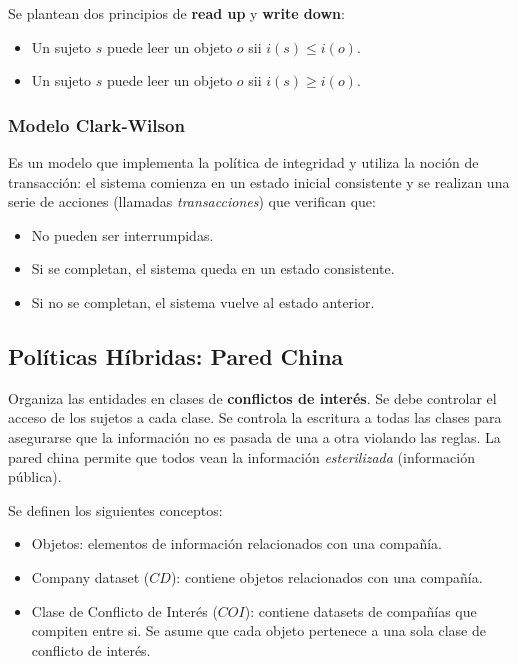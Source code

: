 \documentclass[]{article}
\begin{document}
 Se plantean dos principios de \textbf{read up} y \textbf{write down}:
 \begin{itemize}
 	\item Un sujeto $s$ puede leer un objeto $o$ sii $i(s) \leq i(o)$.
 	\item Un sujeto $s$ puede leer un objeto $o$ sii $i(s) \geq i(o)$.
 \end{itemize}


\subsubsection{Modelo Clark-Wilson}
Es un modelo que implementa la política de integridad y utiliza la noción de transacción: el sistema comienza en un estado inicial consistente y se realizan una serie de acciones (llamadas \emph{transacciones}) que verifican que:
\begin{itemize}
	\item No pueden ser interrumpidas.
	\item Si se completan, el sistema queda en un estado consistente.
	\item Si no se completan, el sistema vuelve al estado anterior.
\end{itemize}

\subsection{Políticas Híbridas: Pared China}
Organiza las entidades en clases de \textbf{conflictos de interés}. Se debe controlar el acceso de los sujetos a cada clase. Se controla la escritura a todas las clases para asegurarse que la información no es pasada de una a otra violando las reglas. La pared china permite que todos vean la información \emph{esterilizada} (información pública).

Se definen los siguientes conceptos:

\begin{itemize}
	\item Objetos: elementos de información relacionados con una compañía.
	\item Company dataset ($CD$): contiene objetos relacionados con una compañía.
	\item Clase de Conflicto de Interés ($COI$): contiene datasets de compañías que compiten entre si. Se asume que cada objeto pertenece a una sola clase de conflicto de interés.
\end{itemize}
\end{document}
